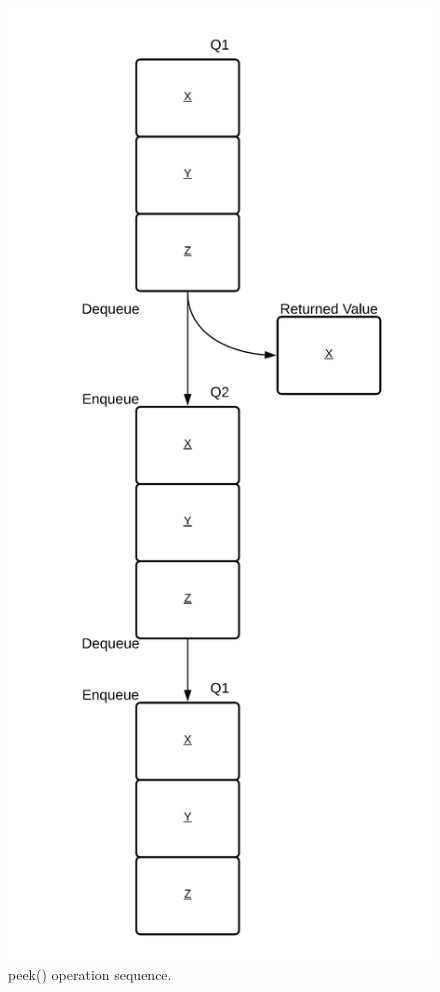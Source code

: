 \documentclass[journal]{IEEEtran}
\begin{document}
\begin{figure}[H]
    \includegraphics[scale = 0.17]{peek.png}
    \caption{peek() operation sequence.}
\end{figure}
\end{document}
